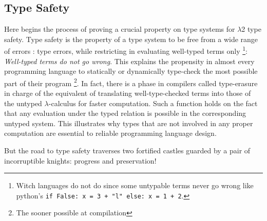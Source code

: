 \documentclass{article}
\begin{document}
    \subsection{Type Safety}
    Here begins the process of proving a crucial property on type systems for $\lambda$2 type safety. Type safety is the property of a type system to be free from a wide range of errors : type errors, while restricting in evaluating well-typed terms only
    \footnote{Witch languages do not do since some untypable terms never go wrong like python's \texttt{if False: x = 3 + "l" else: x = 1 + 2}.}: \textit{Well-typed terms do not go wrong}.
    This explains the propensity in almost every programming language to statically or dynamically type-check the most possible part of their program \footnote{The sooner possible at compilation}. In fact, there is a phase in compilers called type-erasure in charge of the equivalent of translating well-type-checked terms into those of the untyped $\lambda$-calculus for faster computation. Such a function holds on the fact that any evaluation under the typed relation is possible in the corresponding untyped system. This illustrates why types that are not involved in any proper computation are essential to reliable programming language design.\par
    But the road to type safety traverses two fortified castles guarded by a pair of incorruptible knights: progress and preservation!
\end{document}
